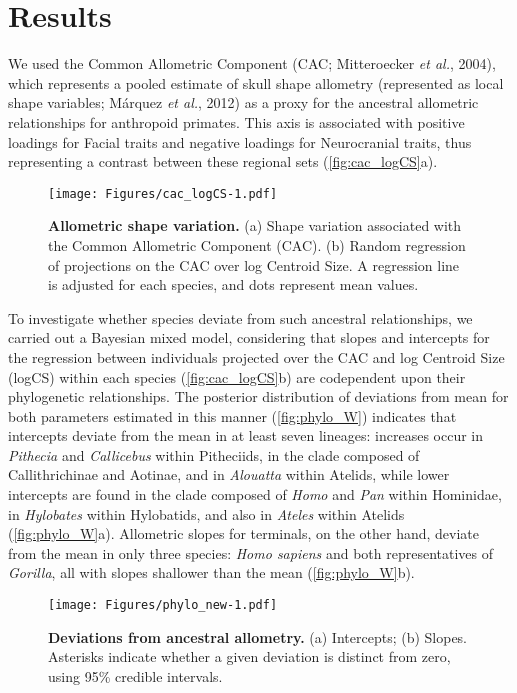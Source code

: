 \documentclass[12pt,]{article}
\begin{document}
\section{Results}\label{results}

We used the Common Allometric Component (CAC; Mitteroecker \emph{et
al.}, 2004), which represents a pooled estimate of skull shape allometry
(represented as local shape variables; Márquez \emph{et al.}, 2012) as a
proxy for the ancestral allometric relationships for anthropoid
primates. This axis is associated with positive loadings for Facial
traits and negative loadings for Neurocranial traits, thus representing
a contrast between these regional sets (\autoref{fig:cac_logCS}a).

\begin{figure}[htbp]
\centering
\texttt{[image: Figures/cac\_logCS-1.pdf]}
\caption{\textbf{Allometric shape variation.} (a) Shape variation
associated with the Common Allometric Component (CAC). (b) Random
regression of projections on the CAC over log Centroid Size. A
regression line is adjusted for each species, and dots represent mean
values. \label{fig:cac_logCS}}
\end{figure}

To investigate whether species deviate from such ancestral
relationships, we carried out a Bayesian mixed model, considering that
slopes and intercepts for the regression between individuals projected
over the CAC and log Centroid Size (logCS) within each species
(\autoref{fig:cac_logCS}b) are codependent upon their phylogenetic
relationships. The posterior distribution of deviations from mean for
both parameters estimated in this manner (\autoref{fig:phylo_W})
indicates that intercepts deviate from the mean in at least seven
lineages: increases occur in \emph{Pithecia} and \emph{Callicebus}
within Pitheciids, in the clade composed of Callithrichinae and Aotinae,
and in \emph{Alouatta} within Atelids, while lower intercepts are found
in the clade composed of \emph{Homo} and \emph{Pan} within Hominidae, in
\emph{Hylobates} within Hylobatids, and also in \emph{Ateles} within
Atelids (\autoref{fig:phylo_W}a). Allometric slopes for terminals, on
the other hand, deviate from the mean in only three species: \emph{Homo
sapiens} and both representatives of \emph{Gorilla}, all with slopes
shallower than the mean (\autoref{fig:phylo_W}b).

\begin{figure}[htbp]
\centering
\texttt{[image: Figures/phylo\_new-1.pdf]}
\caption{\textbf{Deviations from ancestral allometry.} (a) Intercepts;
(b) Slopes. Asterisks indicate whether a given deviation is distinct
from zero, using 95\% credible intervals. \label{fig:phylo_W}}
\end{figure}
\end{document}
